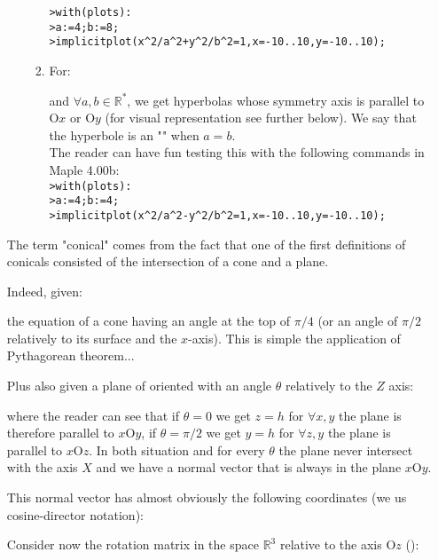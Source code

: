 \begin{enumerate}
\begin{itemize}
\begin{enumerate}
				\texttt{>with(plots):}\\
				\texttt{>a:=4;b:=8;}\\
				\texttt{>implicitplot(x\string^2/a\string^2+y\string^2/b\string^2=1,x=-10..10,y=-10..10);}
				
				\item For:
				
				and $\forall a,b \in \mathbb{R}^{*}$, we get hyperbolas whose symmetry axis is parallel to $\text{O}x$ or $\text{O}y$ (for visual representation see further below). We say that the hyperbole is an "\label{hyperbola}" when $a = b$.\\
				
				The reader can have fun testing this with the following commands in Maple 4.00b:\\
				
				\texttt{>with(plots):}\\
				\texttt{>a:=4;b:=4;}\\
				\texttt{>implicitplot(x\string^2/a\string^2-y\string^2/b\string^2=1,x=-10..10,y=-10..10);}	
			\end{enumerate}
		\end{itemize}
		The term "conical" comes from the fact that one of the first definitions of conicals consisted of the intersection of a cone and a plane.
		
		Indeed, given:		 
				
		the equation of a cone having an angle at the top of $\pi/4$ (or an angle of $\pi/2$ relatively to its surface and the $x$-axis). This is simple the application of Pythagorean theorem...
		
		Plus also given a plane of oriented with an angle $\theta$ relatively to the $Z$ axis:
		
		where the reader can see that if $\theta=0$ we get $z=h$ for $\forall x,y$ the plane is therefore parallel to $x\text{O}y$, if $\theta=\pi/2$ we get $y=h$ for $\forall z,y$ the plane is parallel to $x\text{O}z$. In both situation and for every $\theta$ the plane never intersect with the axis $X$ and we have a normal vector that is always in the plane $x\text{O}y$.
		
		This normal vector has almost obviously the following coordinates (we us cosine-director notation):
		
		Consider now the rotation matrix in the space $\mathbb{R}^3$ relative to the axis $\text{O}z$ ():
		

\end{enumerate}
